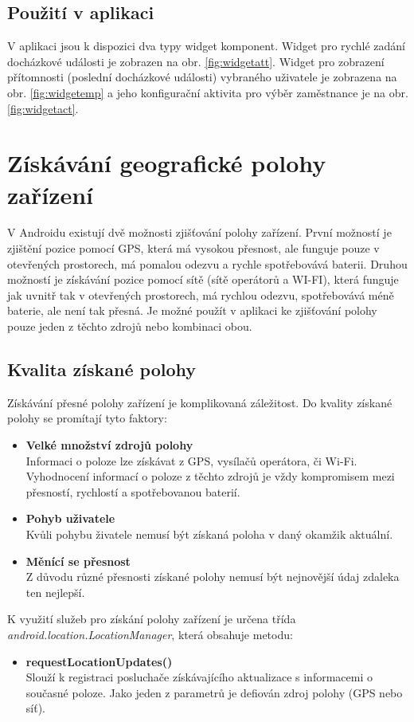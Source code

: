\documentclass{diplomka}
\begin{document}
\subsection*{Použití v aplikaci}
V aplikaci jsou k dispozici dva typy widget komponent. Widget pro rychlé zadání docházkové události je zobrazen na obr. \ref{fig:widgetatt}. Widget pro zobrazení přítomnosti (poslední docházkové události) vybraného uživatele je zobrazena na obr. \ref{fig:widgetemp} a jeho konfigurační aktivita pro výběr zaměstnance je na obr. \ref{fig:widgetact}.


\section{Získávání geografické polohy zařízení}
V Androidu existují dvě možnosti zjišťování polohy zařízení. První možností je zjištění pozice pomocí GPS, která má vysokou přesnost, ale funguje pouze v otevřených prostorech, má pomalou odezvu a rychle spotřebovává baterii. Druhou možností je získávání pozice pomocí sítě (sítě operátorů a WI-FI), která funguje jak uvnitř tak v otevřených prostorech, má rychlou odezvu, spotřebovává méně baterie, ale není tak přesná. Je možné použít v aplikaci ke zjišťování polohy pouze jeden z těchto zdrojů nebo kombinaci obou.
\subsection*{Kvalita získané polohy}
Získávání přesné polohy zařízení je komplikovaná záležitost. Do kvality získané polohy se promítají tyto faktory:
\begin{itemize}[]
\item \textbf{Velké množství zdrojů polohy}\\
Informaci o poloze lze získávat z GPS, vysílačů operátora, či Wi-Fi. Vyhodnocení informací o poloze z těchto zdrojů je vždy kompromisem mezi přesností, rychlostí a spotřebovanou baterií.
\item \textbf{Pohyb uživatele}\\
Kvůli pohybu živatele nemusí být získaná poloha v daný okamžik aktuální.
\item \textbf{Měnící se přesnost}\\
Z důvodu různé přesnosti získané polohy nemusí být nejnovější údaj zdaleka ten nejlepší.
\end{itemize}
\noindent
K využití služeb pro získání polohy zařízení je určena třída\\ \emph{android.location.LocationManager}, která obsahuje metodu:
\begin{itemize}[]
\item \textbf{requestLocationUpdates()}\\
Slouží k registraci posluchače získávajícího aktualizace s informacemi o současné poloze. Jako jeden z parametrů je defiován zdroj polohy (GPS nebo síť).
\end{itemize}
\end{document}
